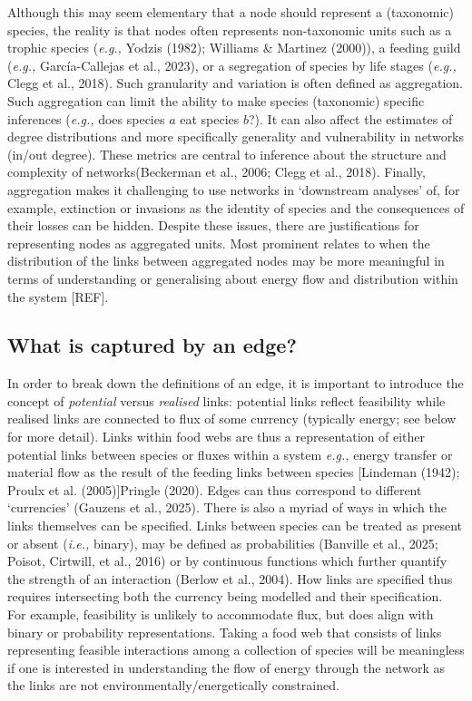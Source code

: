 \documentclass[
]{article}
\begin{document}
Although this may seem elementary that a node should represent a
(taxonomic) species, the reality is that nodes often represents
non-taxonomic units such as a trophic species (\emph{e.g.,} Yodzis
(1982); Williams \& Martinez (2000)), a feeding guild (\emph{e.g.,}
García-Callejas et al., 2023), or a segregation of species by life
stages (\emph{e.g.,} Clegg et al., 2018). Such granularity and variation
is often defined as aggregation. Such aggregation can limit the ability
to make species (taxonomic) specific inferences (\emph{e.g.,} does
species \(a\) eat species \(b\)?). It can also affect the estimates of
degree distributions and more specifically generality and vulnerability
in networks (in/out degree). These metrics are central to inference
about the structure and complexity of networks(Beckerman et al., 2006;
Clegg et al., 2018). Finally, aggregation makes it challenging to use
networks in `downstream analyses' of, for example, extinction or
invasions as the identity of species and the consequences of their
losses can be hidden. Despite these issues, there are justifications for
representing nodes as aggregated units. Most prominent relates to when
the distribution of the links between aggregated nodes may be more
meaningful in terms of understanding or generalising about energy flow
and distribution within the system {[}REF{]}.

\subsection{What is captured by an
edge?}\label{what-is-captured-by-an-edge}

In order to break down the definitions of an edge, it is important to
introduce the concept of \emph{potential} versus \emph{realised} links:
potential links reflect feasibility while realised links are connected
to flux of some currency (typically energy; see below for more detail).
Links within food webs are thus a representation of either potential
links between species or fluxes within a system \emph{e.g.,} energy
transfer or material flow as the result of the feeding links between
species {[}Lindeman (1942); Proulx et al. (2005){]}Pringle (2020). Edges
can thus correspond to different `currencies' (Gauzens et al., 2025).
There is also a myriad of ways in which the links themselves can be
specified. Links between species can be treated as present or absent
(\emph{i.e.,} binary), may be defined as probabilities (Banville et al.,
2025; Poisot, Cirtwill, et al., 2016) or by continuous functions which
further quantify the strength of an interaction (Berlow et al., 2004).
How links are specified thus requires intersecting both the currency
being modelled and their specification. For example, feasibility is
unlikely to accommodate flux, but does align with binary or probability
representations. Taking a food web that consists of links representing
feasible interactions among a collection of species will be meaningless
if one is interested in understanding the flow of energy through the
network as the links are not environmentally/energetically constrained.
\end{document}
